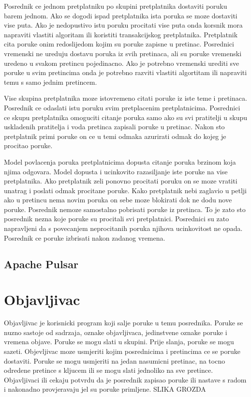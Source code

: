 \documentclass[times, utf8, diplomski, numeric]{fer}
\begin{document}
Posrednik ce jednom pretplatniku po skupini pretplatnika dostaviti poruku barem jednom. Ako se dogodi ispad pretplatnika ista poruka se moze dostaviti vise puta. Ako je nedopustivo istu poruku procitati vise puta onda korsnik mora napraviti vlastiti algoritam ili koristiti transakcijskog pretplatnika. Pretplatnik cita poruke onim redoslijedom kojim su poruke zapisne u pretinac. Posrednici vremenski ne ureduju dostavu poruka iz svih pretinaca, ali su poruke vremenski uredeno u svakom pretincu pojedinacno. Ako je potrebno vremenski urediti sve poruke u svim pretincima onda je potrebno razviti vlastiti algortitam ili napraviti temu s samo jednim pretincem.

Vise skupina pretplatnika moze istovremeno citati poruke iz iste teme i pretinaca. Posrednik ce odaslati istu poruku svim pretplacenim pretplatnicima. Posrednici ce skupu pretplatnika omoguciti citanje poruka samo ako su svi pratitelji u skupu uskladenih pratitelja i voda pretinca zapisali poruke u pretinac. Nakon sto pretplatnik primi poruke on ce u temi odmaka azurirati odmak do kojeg je procitao poruke.

Model povlacenja poruka pretplatnicima dopusta citanje poruka brzinom koja njima odgovara. Model dopusta i ucinkovito razasiljanje iste poruke na vise pretplatnika. Ako pretplatnik zeli ponovno procitati poruku on se moze vratiti unatrag i poslati odmak procitane poruke. Kako pretplatnik nebi zaglavio u petlji ako u pretincu nema novim poruka on sebe moze blokirati dok ne dodu nove poruke. Posrednik nemoze samostalno pobrisati poruke iz pretinca. To je zato sto posrednik nezna koje poruke su procitali svi pretplatnici. Posrednici su zato napravljeni da s povecanjem neprocitanih poruka njihova ucinkovitost ne opada. Posrednik ce poruke izbrisati nakon zadanog vremena.



\section{Apache Pulsar}



\chapter{Objavljivac}
Objavljivac je korisnicki program koji salje poruke u temu posrednika. Poruke se nuzno sastoje od sadrzaja, oznake objavljivaca, jedinstvene oznake poruke i vremena objave. Poruke se mogu slati u skupini. Prije slanja, poruke se mogu sazeti. Objevljivac moze usmjeriti kojim posrednicima i pretincima ce se poruke dostaviti. Poruke se mogu usmjeriti na jedan nasumicni pretinac, na tocno odredene pretince s kljucem ili se mogu slati jednoliko na sve pretince. Objavljivaci ili cekaju potvrdu da je posrednik zapisao poruke ili nastave s radom i nakonadno provjeravaju jel su poruke primljene.
SLIKA GROZDA
\end{document}
